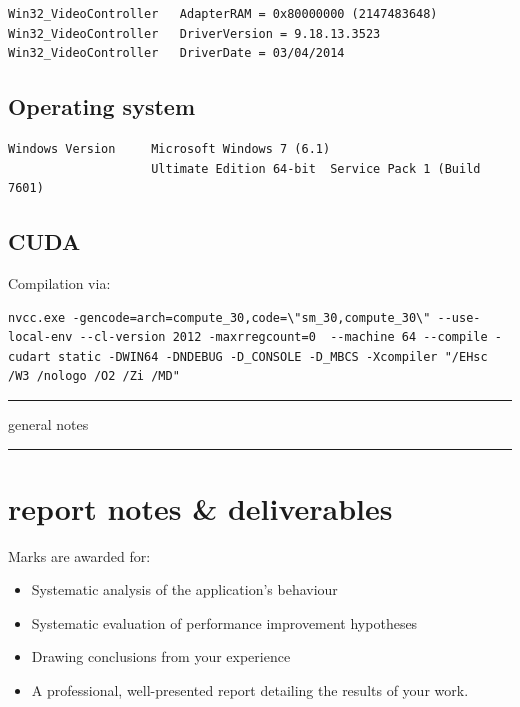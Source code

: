 \documentclass[11pt, oneside, a4paper]{article}
\begin{document}
\begin{appendices}
\begin{verbatim}
Win32_VideoController   AdapterRAM = 0x80000000 (2147483648)
Win32_VideoController   DriverVersion = 9.18.13.3523
Win32_VideoController   DriverDate = 03/04/2014
\end{verbatim}

\subsection{Operating system} %
\label{sub:operating_system}
\begin{verbatim}
Windows Version     Microsoft Windows 7 (6.1)
                    Ultimate Edition 64-bit  Service Pack 1 (Build 7601) 
\end{verbatim}

\subsection{CUDA} %
\label{sub:cuda}
Compilation via:
\begin{verbatim}
nvcc.exe -gencode=arch=compute_30,code=\"sm_30,compute_30\" --use-local-env --cl-version 2012 -maxrregcount=0  --machine 64 --compile -cudart static -DWIN64 -DNDEBUG -D_CONSOLE -D_MBCS -Xcompiler "/EHsc /W3 /nologo /O2 /Zi /MD"
\end{verbatim}

\end{appendices}


\hspace{1em}
\hrule
general notes
\hspace{1em}
\hrule

\section{report notes \& deliverables} %
\label{sec:report_notes_on_deliverables}

Marks are awarded for:
\begin{itemize}
\item  Systematic analysis of the application's behaviour
\item  Systematic evaluation of performance improvement hypotheses
\item  Drawing conclusions from your experience
\item  A professional, well-presented report detailing the results of your work.
\end{itemize}
\end{document}
